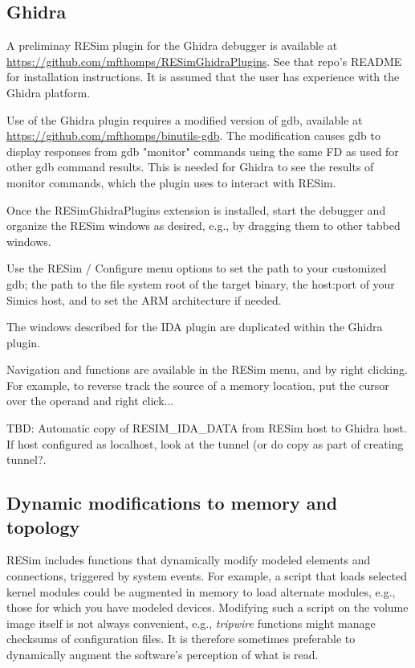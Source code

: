 \documentclass[titlepage]{article}
\begin{document}
\subsection{Ghidra}
A preliminay RESim plugin for the Ghidra debugger is available at \url{https://github.com/mfthomps/RESimGhidraPlugins}.
See that repo's README for installation instructions.  It is assumed that the user has experience with the Ghidra platform.

Use of the Ghidra plugin requires a modified version of gdb, available at
\url{https://github.com/mfthomps/binutils-gdb}.  The modification causes
gdb to display responses from gdb "monitor" commands using the same FD as used
for other gdb command results.  This is needed for Ghidra to see the results of monitor commands, which the plugin
uses to interact with RESim.

Once the RESimGhidraPlugins extension is installed, start the debugger and organize the RESim windows
as desired, e.g., by dragging them to other tabbed windows.

Use the RESim / Configure menu options to set the path to your customized gdb; the path to
the file system root of the target binary, the host:port of your Simics host, and to set the ARM architecture if needed.

The windows described for the IDA plugin are duplicated within the Ghidra plugin.

Navigation and functions are available in the RESim menu, and by right clicking.  For example, to reverse track
the source of a memory location, put the cursor over the operand and right click...

TBD: Automatic copy of RESIM\_IDA\_DATA from RESim host to Ghidra host.  If host configured as localhost, look
at the tunnel (or do copy as part of creating tunnel?.  


\subsection{Dynamic modifications to memory and topology}
\label{dmod}
RESim includes functions that dynamically modify modeled elements and connections,
triggered by system events.  For example, a script that loads selected kernel modules could be augmented in memory to
load alternate modules, e.g., those for which you have modeled devices.  Modifying such a script on the volume
image itself is not always convenient, e.g., \textit{tripwire} functions might manage checksums of
configuration files.  It is therefore sometimes preferable to dynamically augment the software's perception of what is read.
\end{document}
